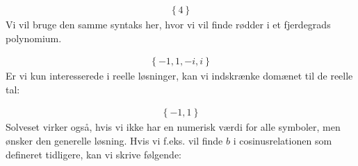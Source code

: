 \documentclass[letterpaper,10pt,english]{jupyterBook}
\begin{document}
\begin{sphinxVerbatim}[commandchars=\\\{\}]
       
\end{sphinxVerbatim}
\begin{equation*}
\begin{split}\displaystyle \left\{4\right\}\end{split}
\end{equation*}
Vi vil bruge den samme syntaks her, hvor vi vil finde rødder i et fjerdegrads polynomium.

\begin{sphinxVerbatim}[commandchars=\\\{\}]
   
      
    
\end{sphinxVerbatim}
\begin{equation*}
\begin{split}\displaystyle \left\{-1, 1, - i, i\right\}\end{split}
\end{equation*}
Er vi kun interesserede i reelle løsninger, kan vi indskrænke domænet til de reelle tal:

\begin{sphinxVerbatim}[commandchars=\\\{\}]
    
\end{sphinxVerbatim}
\begin{equation*}
\begin{split}\displaystyle \left\{-1, 1\right\}\end{split}
\end{equation*}
Solveset virker også, hvis vi ikke har en numerisk værdi for alle symboler, men ønsker den generelle løsning. Hvis vi f.eks. vil finde \(b\) i cosinusrelationen som defineret tidligere, kan vi skrive følgende:
\end{document}
